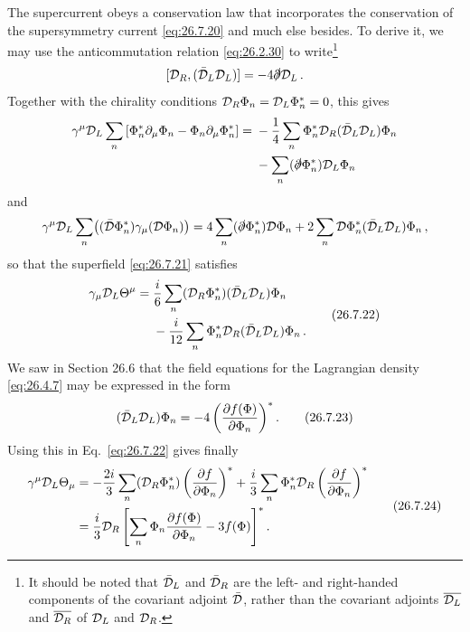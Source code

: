 The supercurrent obeys a conservation law that incorporates the conservation
of the supersymmetry current \eqref{eq:26.7.20} and much else besides. To
derive it, we may use the anticommutation relation \eqref{eq:26.2.30} to
write\footnote{It should be noted that \(\bar{\mathcal{D}}_L\) and
\(\bar{\mathcal{D}}_R\) are the left- and right-handed components of the
covariant adjoint \(\bar{\mathcal{D}}\), rather than the covariant adjoints
\(\overline{\mathcal{D}_L}\) and \(\overline{\mathcal{D}_R}\) of \(\mathcal{D}_L\) and
\(\mathcal{D}_R\).}
\[
  [\mathcal{D}_R,(\bar{\mathcal{D}}_L\mathcal{D}_L)]
  =-4\slashed{\partial}\mathcal{D}_L\,.
\]
Together with the chirality conditions
\(\mathcal{D}_R\Phi_n=\mathcal{D}_L\Phi_n^*=0\), this gives
\[
  \begin{aligned}
  \gamma^\mu\mathcal{D}_L\sum_n
  \left[\Phi_n^*\partial_\mu\Phi_n
       -\Phi_n\partial_\mu\Phi_n^*\right]
  ={}&-\frac14\sum_n
      \Phi_n^*\mathcal{D}_R(\bar{\mathcal{D}}_L\mathcal{D}_L)\Phi_n
  \\
     &-\sum_n(\slashed{\partial}\Phi_n^*)\mathcal{D}_L\Phi_n
  \end{aligned}
\]
and
\[
  \gamma^\mu\mathcal{D}_L\sum_n
  \bigl((\bar{\mathcal{D}}\Phi_n^*)\gamma_\mu(\mathcal{D}\Phi_n)\bigr)
  =4\sum_n(\slashed{\partial}\Phi_n^*)\mathcal{D}\Phi_n
   +2\sum_n\mathcal{D}\Phi_n^*
      (\bar{\mathcal{D}}_L\mathcal{D}_L)\Phi_n\,,
\]
so that the superfield \eqref{eq:26.7.21} satisfies
\begin{equation}
  \begin{aligned}
  \gamma_\mu\mathcal{D}_L\Theta^\mu
  ={}&\frac{i}{6}\sum_n
      (\mathcal{D}_R\Phi_n^*)(\bar{\mathcal{D}}_L\mathcal{D}_L)\Phi_n
  \\
     &-\frac{i}{12}\sum_n
      \Phi_n^*\mathcal{D}_R(\bar{\mathcal{D}}_L\mathcal{D}_L)\Phi_n\,.
  \end{aligned}
  \tag{26.7.22}\label{eq:26.7.22}
\end{equation}
We saw in Section 26.6 that the field equations for the Lagrangian density
\eqref{eq:26.4.7} may be expressed in the form
\begin{equation}
  (\bar{\mathcal{D}}_L\mathcal{D}_L)\Phi_n
  =-4\left(\frac{\partial f(\Phi)}{\partial\Phi_n}\right)^* .
  \tag{26.7.23}\label{eq:26.7.23}
\end{equation}
Using this in Eq.~\eqref{eq:26.7.22} gives finally
\begin{equation}
  \begin{aligned}
  \gamma^\mu\mathcal{D}_L\Theta_\mu
  &=-\frac{2i}{3}\sum_n
    (\mathcal{D}_R\Phi_n^*)
    \left(\frac{\partial f}{\partial\Phi_n}\right)^*
   +\frac{i}{3}\sum_n
    \Phi_n^*\mathcal{D}_R
    \left(\frac{\partial f}{\partial\Phi_n}\right)^*
  \\
  &=\frac{i}{3}\mathcal{D}_R
    \left[
      \sum_n\Phi_n\frac{\partial f(\Phi)}{\partial\Phi_n}
      -3f(\Phi)
    \right]^* .
  \end{aligned}
  \tag{26.7.24}\label{eq:26.7.24}
\end{equation}
